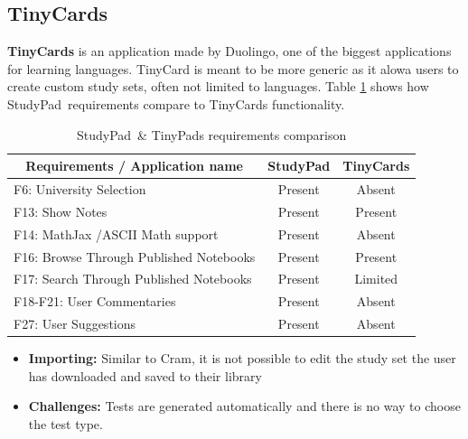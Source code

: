 \documentclass[thesis=B,english]{FITthesis}[2012/10/20]
\newcommand{\appname}{StudyPad}
\begin{document}
\subsection{TinyCards}

\textbf{TinyCards} is an application made by Duolingo, one of the biggest applications for learning languages. TinyCard is meant to be more generic as it alowa users to create custom study sets, often not limited to languages. Table \ref{tab:tinycards} shows how \appname\ requirements compare to TinyCards functionality.

\begin{table}[H]
\caption{\appname\ \& TinyPads requirements comparison}
\label{tab:tinycards}
\begin{tabular}{|l|c|c|}
\hline
\multicolumn{1}{|c|}{\textbf{Requirements / Application name}} & \multicolumn{1}{l|}{\textbf{StudyPad}} & \multicolumn{1}{l|}{\textbf{TinyCards}} \\ \hline
F6: University Selection                                       & Present                                & Absent                                  \\ \hline
F13: Show Notes                                                & Present                                & Present                                 \\ \hline
F14: MathJax /ASCII Math support                               & Present                                & Absent                                  \\ \hline
F16: Browse Through Published Notebooks                        & Present                                & Present                                 \\ \hline
F17: Search Through Published Notebooks                    & Present                                & Limited                                 \\ \hline
F18-F21: User Commentaries                                     & Present                                & Absent                                  \\ \hline
F27: User Suggestions                                          & Present                                & Absent                                  \\ \hline
\end{tabular}
\end{table}


	\begin{itemize}
		\item \textbf{Importing:} Similar to Cram, it is not possible to edit the study set the user has downloaded and saved to their library
		\item \textbf{Challenges:} Tests are generated automatically and there is no way to choose the test type.
	\end{itemize}
	
\end{document}
